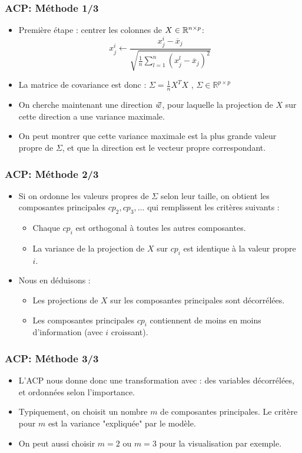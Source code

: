 \begin{frame}
\frametitle{ACP: Méthode 1/3}
  \begin{itemize}
  	\item Première étape : centrer les colonnes de $X \in {\mathbb R}^{n \times p}$: 
 \begin{equation*}
 x^i_j \leftarrow \frac{x_j^i - \overline{x}_j}{\sqrt{\frac{1}{n}\sum_{l=1}^n(x_j^l - \overline{x}_j)^2}} 
 \end{equation*}
 	\item La matrice de covariance est donc : $\Sigma = \frac1n X^TX$ , $\Sigma \in \mathbb{R}^{p \times p}$
 	\item On cherche maintenant une direction $\vec{w}$, pour laquelle la projection de $X$ sur cette direction a une variance maximale. 
 	\item On peut montrer que cette variance maximale est la plus grande valeur propre de $\Sigma$, et que la direction est le vecteur propre correspondant. 
  \end{itemize}
\end{frame}

\begin{frame}
\frametitle{ACP: Méthode 2/3}
  \begin{itemize}
  	\item Si on ordonne les valeurs propres de $\Sigma$ selon leur taille, on obtient les composantes principales $cp_2, cp_3, \ldots$ qui remplissent les critères suivants : 
  	\begin{itemize}
  		\item Chaque $cp_i$ est orthogonal à toutes les autres composantes.
  		\item La variance de la projection de $X$ sur $cp_i$ est identique à la valeur propre $i$. 
  	\end{itemize}
  	\item Nous en déduisons : 
  	\begin{itemize}
  		\item Les projections de $X$ sur les composantes principales sont décorrélées. 
  		\item Les composantes principales $cp_i$ contiennent de moins en moins d'information (avec $i$ croissant). 
  	\end{itemize}
  \end{itemize}
\end{frame}

\begin{frame}
\frametitle{ACP: Méthode 3/3}
  \begin{itemize}
  	\item L'ACP nous donne donc une transformation avec : des variables décorrélées, et ordonnées selon l'importance. 
  	\item Typiquement, on choisit un nombre $m$ de composantes principales. Le critère pour $m$ est la variance "expliquée" par le modèle. 
  	\item On peut aussi choisir $m=2$ ou $m=3$ pour la visualisation par exemple.   
  \end{itemize}
\end{frame}

